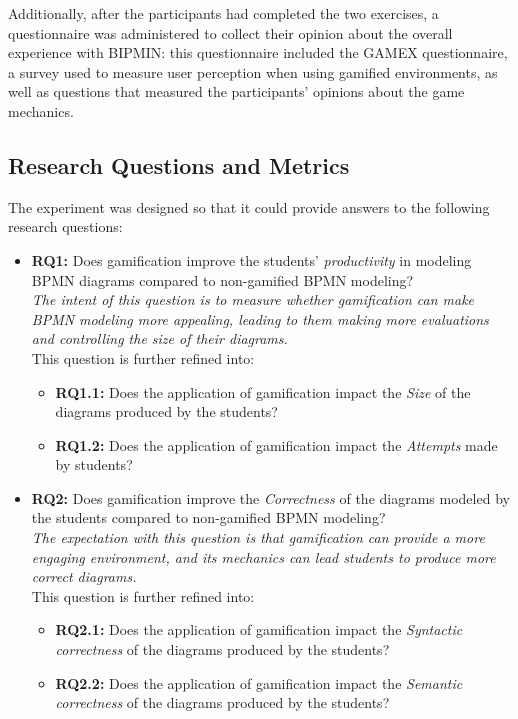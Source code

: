 Additionally, after the participants had completed the two exercises, a questionnaire was administered to collect their opinion about the overall experience with BIPMIN: this questionnaire included the GAMEX questionnaire, a survey used to measure user perception when using gamified environments, as well as questions that measured the participants' opinions about the game mechanics.



\subsection{Research Questions and Metrics}

The experiment was designed so that it could provide answers to the following research questions:
\begin{itemize}
    \item \textbf{RQ1:} Does gamification improve the students' \textit{productivity} in modeling BPMN diagrams compared to non-gamified BPMN modeling?\\
    \emph{The intent of this question is to measure whether gamification can make BPMN modeling more appealing, leading to them making more evaluations and controlling the size of their diagrams.}\\
    This question is further refined into:
    \begin{itemize}
        \item \textbf{RQ1.1:} Does the application of gamification impact the \textit{Size} of the diagrams produced by the students?
        \item \textbf{RQ1.2:} Does the application of gamification impact the \textit{Attempts} made by students?
    \end{itemize}
    \item \textbf{RQ2:} Does gamification improve the \textit{Correctness} of the diagrams modeled by the students compared to non-gamified BPMN modeling?\\
    \emph{The expectation with this question is that gamification can provide a more engaging environment, and its mechanics can lead students to produce more correct diagrams.}\\
    This question is further refined into:
    \begin{itemize}
        \item \textbf{RQ2.1:} Does the application of gamification impact the \textit{Syntactic correctness} of the diagrams produced by the students?
        \item \textbf{RQ2.2:} Does the application of gamification impact the \textit{Semantic correctness} of the diagrams produced by the students?

\end{itemize}
\end{itemize}
